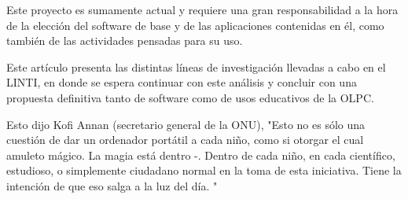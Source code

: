 Este proyecto es sumamente actual y requiere una gran
responsabilidad a la hora de la elección del software de base y
de las aplicaciones contenidas en él, como también de las
actividades pensadas para su uso.

Este artículo presenta las distintas líneas de investigación
llevadas a cabo en el LINTI, en donde se espera continuar con
este análisis y concluir con una propuesta definitiva tanto de
software como de usos educativos de la OLPC.

Esto dijo Kofi Annan (secretario general de la ONU), "Esto no es
sólo una cuestión de dar un ordenador portátil a cada niño,
como si otorgar el cual amuleto mágico. La magia está dentro -.
Dentro de cada niño, en cada científico, estudioso, o
simplemente ciudadano normal en la toma de esta iniciativa.
Tiene la intención de que eso salga a la luz del día. "
   

 
